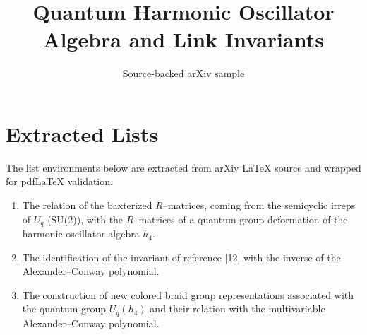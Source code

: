 \documentclass[11pt]{article}
\title{Quantum Harmonic Oscillator Algebra and Link Invariants}
\author{Source-backed arXiv sample}
\date{}
\begin{document}
\maketitle
\section{Extracted Lists}

The list environments below are extracted from arXiv LaTeX source and wrapped for pdfLaTeX validation.

\begin{enumerate}
\item The relation of the baxterized $R$--matrices, coming from
the semicyclic irreps of $U_q$ (SU(2)), with the $R$--matrices
of a quantum group deformation of the harmonic oscillator
algebra $h_4$.

\item The identification of the invariant of reference [12] with
the inverse of the Alexander--Conway polynomial.

\item The construction of new colored braid group
representations associated with the quantum group $U_q (h_4)$
and their relation with the multivariable Alexander--Conway polynomial.
\end{enumerate}
\end{document}
